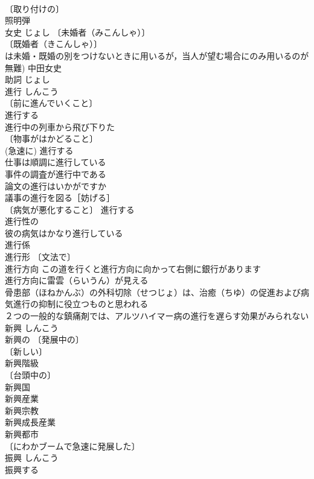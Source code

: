 \documentclass[8pt]{extreport}
\begin{document}
\begin{CJK}{UTF8}{min}
\\	〔取り付けの〕
\\	照明弾 
\\	女史	じょし	〔未婚者（みこんしゃ）〕
\\	〔既婚者（きこんしゃ）〕
\\	は未婚・既婚の別をつけないときに用いるが，当人が望む場合にのみ用いるのが無難) 中田女史 
\\	助詞	じょし	
\\	進行	しんこう	
\\	〔前に進んでいくこと〕
\\	進行する 
\\	進行中の列車から飛び下りた 
\\	〔物事がはかどること〕
\\	(急速に) 進行する 
\\	仕事は順調に進行している 
\\	事件の調査が進行中である 
\\	論文の進行はいかがですか 
\\	議事の進行を図る［妨げる］ 
\\	〔病気が悪化すること〕 進行する 
\\	進行性の 
\\	彼の病気はかなり進行している 
\\	進行係 
\\	進行形 〔文法で〕
\\	進行方向 この道を行くと進行方向に向かって右側に銀行があります 
\\	進行方向に雷雲（らいうん）が見える 
\\	骨患部（ほねかんぶ）の外科切除（せつじょ）は、治癒（ちゆ）の促進および病気進行の抑制に役立つものと思われる 
\\	２つの一般的な鎮痛剤では、アルツハイマー病の進行を遅らす効果がみられない 
\\	新興	しんこう	
\\	新興の 〔発展中の〕
\\	〔新しい〕
\\	新興階級 
\\	〔台頭中の〕
\\	新興国 
\\	新興産業 
\\	新興宗教 
\\	新興成長産業 
\\	新興都市 
\\	〔にわかブームで急速に発展した〕
\\	振興	しんこう	
\\	振興する 

\end{CJK}
\end{document}
